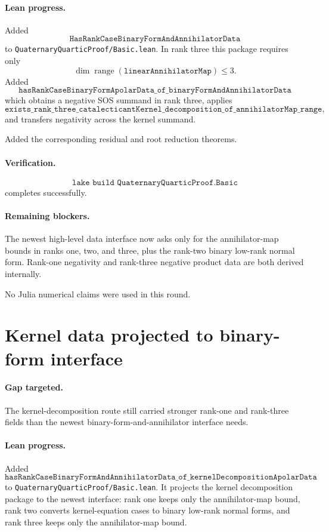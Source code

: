 \documentclass[11pt]{article}
\begin{document}
\paragraph{Lean progress.}
Added
\[
\texttt{HasRankCaseBinaryFormAndAnnihilatorData}
\]
to \texttt{QuaternaryQuarticProof/Basic.lean}.  In rank three this package
requires only
\[
\dim\operatorname{range}(\texttt{linearAnnihilatorMap})\le3.
\]
Added
\[
\texttt{hasRankCaseBinaryFormApolarData\_of\_binaryFormAndAnnihilatorData}
\]
which obtains a negative SOS summand in rank three, applies
\[
\texttt{exists\_rank\_three\_catalecticantKernel\_decomposition\_of\_annihilatorMap\_range},
\]
and transfers negativity across the kernel summand.

Added the corresponding residual and root reduction theorems.

\paragraph{Verification.}
\[
\texttt{lake build QuaternaryQuarticProof.Basic}
\]
completes successfully.

\paragraph{Remaining blockers.}
The newest high-level data interface now asks only for the annihilator-map
bounds in ranks one, two, and three, plus the rank-two binary low-rank normal
form.  Rank-one negativity and rank-three negative product data are both
derived internally.

No Julia numerical claims were used in this round.

\section*{Kernel data projected to binary-form interface}

\paragraph{Gap targeted.}
The kernel-decomposition route still carried stronger rank-one and rank-three
fields than the newest binary-form-and-annihilator interface needs.

\paragraph{Lean progress.}
Added
\[
\texttt{hasRankCaseBinaryFormAndAnnihilatorData\_of\_kernelDecompositionApolarData}
\]
to \texttt{QuaternaryQuarticProof/Basic.lean}.  It projects the kernel
decomposition package to the newest interface: rank one keeps only the
annihilator-map bound, rank two converts kernel-equation cases to binary
low-rank normal forms, and rank three keeps only the annihilator-map bound.
\end{document}
